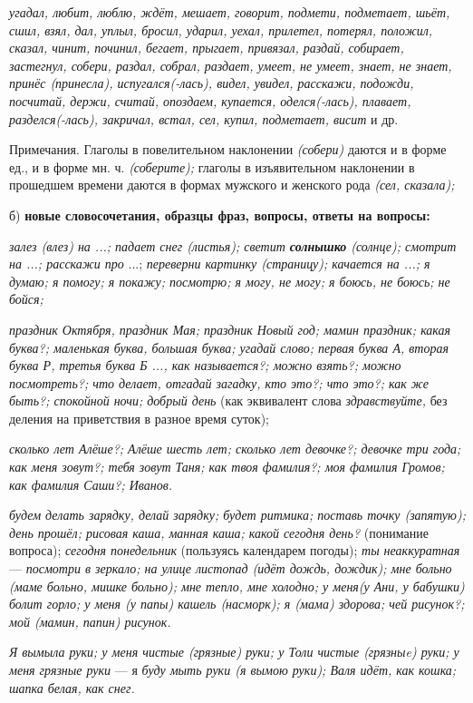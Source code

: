 \documentclass[a5paper]{book}
\renewcommand{\emph}[1]{\textit{#1}}
\begin{document}
\emph{угадал, любит, люблю, ждёт, мешает, говорит, подмети, подметает,
шьёт, сшил, взял, дал, уплыл, бросил, ударил, уехал, прилетел, потерял,
положил, сказал, чинит, починил, бегает, прыгает, привязал, раздай,
собирает, застегнул, собери, раздал, собрал, раздает, умеет, не умеет,
знает, не знает, принёс (принесла), испугался(-лась), видел, увидел,
расскажи, подожди, посчитай, держи, считай, опоздаем, купается,
оделся(-лась), плавает, разделся(-лась), закричал, встал, сел, купил,
подметает, висит} и др.

Примечания. Глаголы в повелительном наклонении \emph{(собери)} даются и
в форме ед., и в форме мн. ч. \emph{(соберите);} глаголы в изъявительном
наклонении в прошедшем времени даются в формах мужского и женского рода
\emph{(сел, сказала);}

б) \textbf{новые словосочетания, образцы фраз, вопросы, ответы на
вопросы:}

\emph{залез (влез) на ...; падает снег (листья); светит
\textbf{солнышко} (солнце); смотрит на ...; расскажи про} ...;
\emph{переверни картинку (страницу); качается на ...; я думаю; я помогу;
я покажу; посмотрю; я могу, не могу; я боюсь, не боюсь; не бойся;}

\emph{праздник Октября, праздник Мая; праздник Новый год; мамин
праздник; какая буква?; маленькая буква, большая буква; угадай слово;
первая буква А, вторая буква Р, третья буква Б ..., как называется?;
можно взять?; можно посмотреть?; что делает, отгадай загадку, кто это?;
что это?; как же быть?; спокойной ночи; добрый день} (как эквивалент
слова \emph{здравствуйте,} без деления на приветствия в разное время
суток);

\emph{сколько лет Алёше?; Алёше шесть лет; сколько лет девочке?; девочке
три года; как меня зовут?; тебя зовут Таня; как твоя фамилия?; моя
фамилия Громов; как фамилия Саши?; Иванов.}

\emph{будем делать зарядку, делай зарядку; будет ритмика; поставь точку
(запятую); день прошёл; рисовая каша, манная каша; какой сегодня день?}
(понимание вопроса); \emph{сегодня понедельник} (пользуясь календарем
погоды); \emph{ты неаккуратная} --- \emph{посмотри в зеркало; на улице
листопад (идёт дождь, дождик); мне больно (маме больно, мишке больно);
мне тепло, мне холодно; у меня(у Ани, у бабушки) болит горло; у меня (у
папы) кашель (насморк); я (мама) здорова; чей рисунок?; мой (мамин,
папин) рисунок.}

\emph{Я вымыла руки; у меня чистые (грязные) руки; у Толи чистые
(грязныe) руки; у меня грязные руки} --- я \emph{буду мыть руки (я вымою
руки); Валя идёт, как кошка; шапка белая, как снег.}
\end{document}
